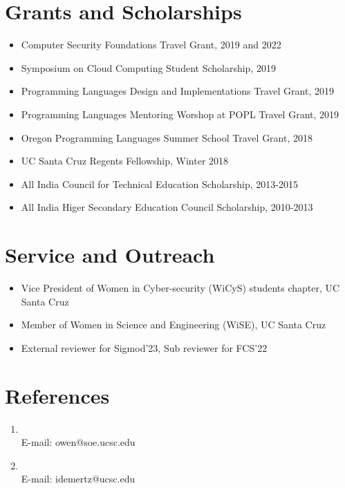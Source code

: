 \documentclass[9pt,a4paper]{moderncv}
\begin{document}
\section{Grants and Scholarships} 
\begin{itemize}
\item Computer Security Foundations Travel Grant, 2019 and 2022 
\item Symposium on Cloud Computing Student Scholarship, 2019
\item Programming Languages Design and Implementations Travel Grant, 2019
\item Programming Languages Mentoring Worshop at POPL Travel Grant, 2019
\item Oregon Programming Languages Summer School Travel Grant, 2018
\item UC Santa Cruz Regents Fellowship, Winter 2018
\item All India Council for Technical Education Scholarship, 2013-2015
\item All India Higer Secondary Education Council Scholarship, 2010-2013
\end{itemize}
\section{Service and Outreach}
\begin{itemize}
\item Vice President of Women in Cyber-security (WiCyS) students chapter, UC Santa Cruz
\item Member of Women in Science and Engineering (WiSE), UC Santa Cruz
\item External reviewer for Sigmod'23, Sub reviewer for FCS'22
\end{itemize}
\section{References}
\begin{enumerate}
\item \underline{} 
\\
E-mail: owen@soe.ucsc.edu
\item \underline{} 
\\
E-mail: idemertz@ucsc.edu 
\end{enumerate}
\end{document}

